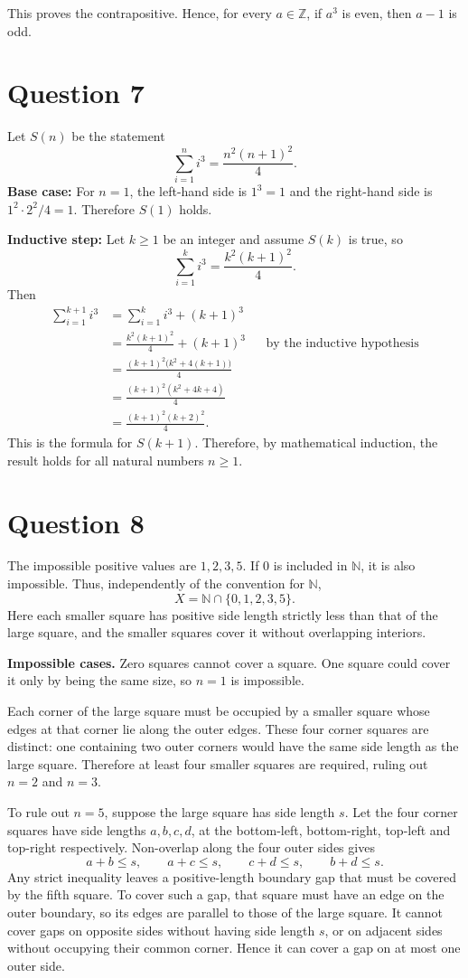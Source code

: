 \documentclass[11pt,a4paper]{article}
\newcommand{\question}[1]{\Needspace{6\baselineskip}\section*{Question #1}}
\begin{document}
This proves the contrapositive. Hence, for every $a\in\mathbb Z$, if $a^3$ is even, then $a-1$ is odd.

\newpage
\question{7}
Let $S(n)$ be the statement
\[
\sum_{i=1}^{n}i^3=\frac{n^2(n+1)^2}{4}.
\]
\textbf{Base case:} For $n=1$, the left-hand side is $1^3=1$ and the right-hand side is
$1^2\cdot2^2/4=1$. Therefore $S(1)$ holds.

\textbf{Inductive step:} Let $k\geq1$ be an integer and assume $S(k)$ is true, so
\[
\sum_{i=1}^{k}i^3=\frac{k^2(k+1)^2}{4}.
\]
Then
\begin{align*}
\sum_{i=1}^{k+1}i^3
&=\sum_{i=1}^{k}i^3+(k+1)^3\\
&=\frac{k^2(k+1)^2}{4}+(k+1)^3
&&\text{by the inductive hypothesis}\\
&=\frac{(k+1)^2\bigl(k^2+4(k+1)\bigr)}{4}\\
&=\frac{(k+1)^2(k^2+4k+4)}{4}\\
&=\frac{(k+1)^2(k+2)^2}{4}.
\end{align*}
This is the formula for $S(k+1)$. Therefore, by mathematical induction, the result holds for all natural numbers $n\geq1$.

\question{8}
The impossible positive values are $1,2,3,5$. If $0$ is included in $\mathbb N$, it is also impossible. Thus, independently of the convention for $\mathbb N$,
\[
X=\mathbb N\cap\{0,1,2,3,5\}.
\]
Here each smaller square has positive side length strictly less than that of the large square, and the smaller squares cover it without overlapping interiors.

\textbf{Impossible cases.}
Zero squares cannot cover a square. One square could cover it only by being the same size, so $n=1$ is impossible.

Each corner of the large square must be occupied by a smaller square whose edges at that corner lie along the outer edges. These four corner squares are distinct: one containing two outer corners would have the same side length as the large square. Therefore at least four smaller squares are required, ruling out $n=2$ and $n=3$.

To rule out $n=5$, suppose the large square has side length $s$. Let the four corner squares have side lengths $a,b,c,d$, at the bottom-left, bottom-right, top-left and top-right respectively. Non-overlap along the four outer sides gives
\[
a+b\leq s,\qquad a+c\leq s,\qquad c+d\leq s,\qquad b+d\leq s.
\]
Any strict inequality leaves a positive-length boundary gap that must be covered by the fifth square. To cover such a gap, that square must have an edge on the outer boundary, so its edges are parallel to those of the large square. It cannot cover gaps on opposite sides without having side length $s$, or on adjacent sides without occupying their common corner. Hence it can cover a gap on at most one outer side.
\end{document}
